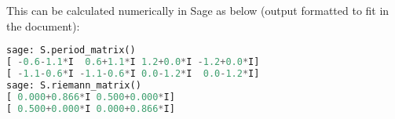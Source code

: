 \documentclass{article}
\begin{document}
\begin{comment}
\eq{
\Omega = \begin{pmatrix} (1-\zeta)B\pround{\frac{1}{2}, \frac{1}{6}} & \zeta^{-15} (1-\zeta)B\pround{\frac{1}{2}, \frac{1}{6}} & -\zeta^{-10} (1-\zeta)B\pround{\frac{1}{2}, \frac{1}{6}} & -\zeta^{-25} (1-\zeta)B\pround{\frac{1}{2}, \frac{1}{6}} \\ (1-\zeta^2)B\pround{\frac{1}{2}, \frac{1}{3}} & \zeta^{-12} (1-\zeta^2)B\pround{\frac{1}{2}, \frac{1}{3}} & -\zeta^{-8} (1-\zeta^2)B\pround{\frac{1}{2}, \frac{1}{3}} & -\zeta^{-20} (1-\zeta^2)B\pround{\frac{1}{2}, \frac{1}{3}}\end{pmatrix}
}
We can calculate 
\eq{
\frac{B\pround{\frac{1}{2}, \frac{1}{6}}}{B\pround{\frac{1}{2}, \frac{1}{3}}} &= \frac{\Gamma(1/2) \Gamma(1/6)}{\Gamma(2/3)} \frac{\Gamma(5/6)}{\Gamma(1/2)\Gamma(1/3)} = \frac{\pi/\sin(\pi/6)}{\pi/\sin(\pi/3)} =\sqrt{3}
}
and so 
\eq{
\Omega \propto \begin{pmatrix} \sqrt{3} & -\sqrt{3} &  -\sqrt{3}\zeta^2  & -\sqrt{3}\zeta^5 \\ 1+\zeta & 1+\zeta & -\zeta^4(1+\zeta) & -\zeta^4(1+\zeta) \end{pmatrix}
}

This means we can calculate the Riemann matrix to be 
\eq{
\tau = \frac{1}{2\sqrt{3}(1+\zeta)}\begin{pmatrix} 1+\zeta & \sqrt{3} \\ -(1+\zeta) & \sqrt{3} \end{pmatrix} \begin{pmatrix} -\sqrt{3}\zeta^2 &  \sqrt{3} \zeta^2 \\ \zeta(1+\zeta) & \zeta(1+\zeta) \end{pmatrix} &= \frac{\zeta}{2}\begin{pmatrix}1-\zeta & 1+\zeta \\ 1+\zeta & 1-\zeta \end{pmatrix} \\
&= \frac{1}{2}\begin{pmatrix} 1 & \sqrt{3}i \\ \sqrt{3}i & 1 \end{pmatrix}
}
\\
\end{comment}
This can be calculated numerically in Sage as below (output formatted to fit in the document):
\begin{lstlisting}[language=Python,frame=single]
sage: S.period_matrix()
[ -0.6-1.1*I  0.6+1.1*I 1.2+0.0*I -1.2+0.0*I]
[ -1.1-0.6*I -1.1-0.6*I 0.0-1.2*I  0.0-1.2*I]
sage: S.riemann_matrix()
[ 0.000+0.866*I 0.500+0.000*I]
[ 0.500+0.000*I 0.000+0.866*I]
\end{lstlisting}
\end{document}
